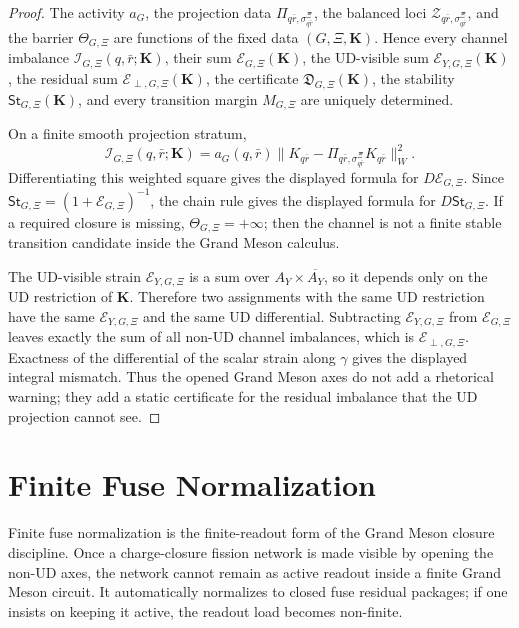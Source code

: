 \documentclass[11pt]{article}
\theoremstyle{definition}
\theoremstyle{plain}
\begin{document}
\begin{proof}
The activity \(a_G\), the projection data
\(\Pi_{q\bar r,\sigma^\Xi_{q\bar r}}\), the balanced loci
\(\mathcal Z_{q\bar r,\sigma^\Xi_{q\bar r}}\), and the barrier
\(\Theta_{G,\Xi}\) are functions of the fixed data
\((G,\Xi,\mathbf K)\).
Hence every channel imbalance \(\mathcal I_{G,\Xi}(q,\bar r;\mathbf K)\), their
sum \(\mathcal E_{G,\Xi}(\mathbf K)\), the UD-visible sum
\(\mathcal E_{Y,G,\Xi}(\mathbf K)\), the residual sum
\(\mathcal E_{\perp,G,\Xi}(\mathbf K)\), the certificate
\(\mathfrak D_{G,\Xi}(\mathbf K)\), the stability
\(\mathsf{St}_{G,\Xi}(\mathbf K)\), and every transition margin
\(M_{G,\Xi}\) are uniquely determined.

On a finite smooth projection stratum,
\[
  \mathcal I_{G,\Xi}(q,\bar r;\mathbf K)
  =
  a_G(q,\bar r)
  \|K_{q\bar r}-\Pi_{q\bar r,\sigma^\Xi_{q\bar r}}K_{q\bar r}\|_W^2 .
\]
Differentiating this weighted square gives the displayed formula for
\(D\mathcal E_{G,\Xi}\).  Since
\(\mathsf{St}_{G,\Xi}=(1+\mathcal E_{G,\Xi})^{-1}\), the chain rule gives the displayed
formula for \(D\mathsf{St}_{G,\Xi}\).  If a required closure is missing,
\(\Theta_{G,\Xi}=+\infty\); then the channel is not a finite stable transition
candidate inside the Grand Meson calculus.

The UD-visible strain \(\mathcal E_{Y,G,\Xi}\) is a sum over
\(A_Y\times\overline{A_Y}\), so it depends only on the UD restriction of
\(\mathbf K\).  Therefore two assignments with the same UD restriction have
the same \(\mathcal E_{Y,G,\Xi}\) and the same UD differential.  Subtracting
\(\mathcal E_{Y,G,\Xi}\) from \(\mathcal E_{G,\Xi}\) leaves exactly the sum of all non-UD
channel imbalances, which is \(\mathcal E_{\perp,G,\Xi}\).  Exactness of the
differential of the scalar strain along \(\gamma\) gives the displayed
integral mismatch.  Thus the opened Grand Meson axes do not add a rhetorical
warning; they add a static certificate for the residual imbalance that the
UD projection cannot see.
\end{proof}

\section{Finite Fuse Normalization}

Finite fuse normalization is the finite-readout form of the Grand Meson
closure discipline.
Once a charge-closure fission network is made visible by opening the
non-UD axes, the network cannot remain as active readout inside a finite
Grand Meson circuit.  It automatically normalizes to closed fuse residual
packages; if one insists on keeping it active, the readout load becomes
non-finite.
\end{document}
